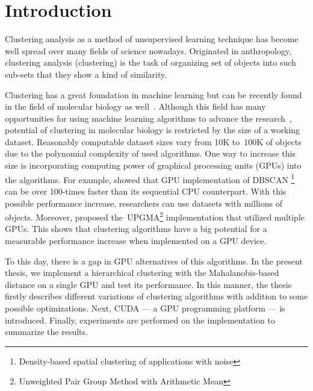 \chapter*{Introduction}


Clustering analysis as a method of unsupervised learning technique has become well spread over many fields of science nowadays. Originated in anthropology, clustering analysis (clustering) is the task of organizing set of objects into such sub-sets that they show a kind of similarity. 

Clustering has a great foundation in machine learning but can be recently found in the field of molecular biology as well~\cite{Nugent2010}. Although this field has many opportunities for using machine learning algorithms to advance the research~\cite{btaa091}, potential of clustering in molecular biology is restricted by the size of a working dataset. Reasonably computable dataset sizes vary from 10K to~100K of objects due to the polynomial complexity of used algorithms. One way to increase this size is incorporating computing power of graphical processing units (GPUs) into the algorithms. For example, \citet{andrade2013g} showed that GPU implementation of DBSCAN \footnote{Density-based spatial clustering of applications with noise} can be over 100-times faster than its sequential CPU counterpart. With this possible performance increase, researchers can use datasets with millions of objects. Moreover, \citet{hua2017mgupgma} proposed the~UPGMA\footnote{Unweighted Pair Group Method with Arithmetic Mean} implementation that utilized multiple GPUs. This shows that clustering algorithms have a big potential for a measurable performance increase when implemented on a GPU device.

To this day, there is a gap in GPU alternatives of this algorithms. In the present thesis, we implement a hierarchical clustering with the Ma\-ha\-la\-no\-bis-based distance on a single GPU and test its performance. In this manner, the thesis firstly describes different variations of clustering algorithms with addition to some possible optimizations. Next, CUDA --- a GPU programming platform --- is introduced. Finally, experiments are performed on the implementation to summarize the results.
